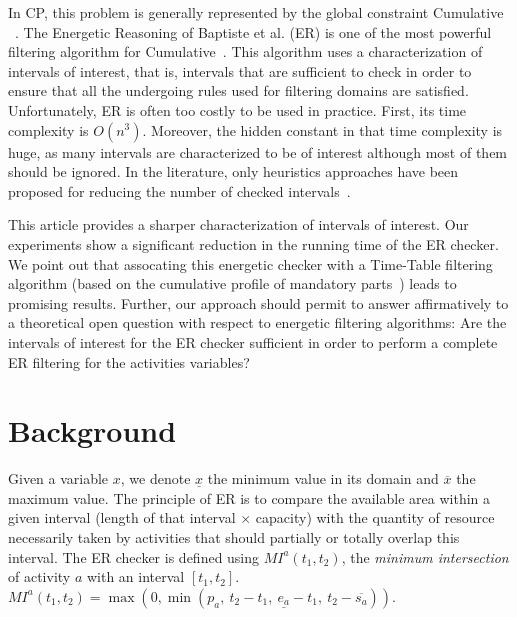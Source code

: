 \documentclass{llncs}
\newcommand \MI[3]{MI^{#3}(#1,#2) }
\begin{document}
In CP, this problem is generally represented by the global constraint \textsf{Cumulative} ~\cite{aggbel93}.
The Energetic Reasoning of Baptiste et al. (ER) is one of the most powerful filtering algorithm for Cumulative~\cite{baptiste:inria-00123562}. 
This algorithm uses a characterization of intervals of interest, that is, intervals that are sufficient to check in order to ensure that all the undergoing rules used 
for filtering domains are satisfied. Unfortunately, ER is often too costly to be used in practice. First, its time complexity is $O(n^3)$. Moreover, 
the hidden constant in that time complexity is huge, as many intervals are characterized to be of interest although most of them should be ignored. 
In the literature, only heuristics approaches have been proposed for reducing the number of checked intervals~\cite{Berthold:2011:ApproxCrit}. 

This article provides a sharper characterization of intervals of interest. 
Our experiments show a significant reduction in the running time of the ER checker. We point out that assocating this energetic checker with a Time-Table filtering algorithm (based on the cumulative profile of mandatory parts~\cite{Letort:ScalableSweep})
leads to promising results. Further, our approach should permit to answer affirmatively to a theoretical open question with respect to energetic filtering algorithms: 
Are the intervals of interest for the ER checker sufficient in order to perform a complete ER filtering for the activities variables?
\section{Background}\label{sec:background}
Given a variable $x$,
we denote $\underline{x}$ the minimum value in its domain and $\overline{x}$ the maximum value. The principle of ER
is to compare the available area within a given interval (length of that interval $\times$ capacity) with the quantity of resource necessarily taken by 
activities that should partially or totally overlap this interval. The ER checker is defined using $\MI{t_1}{t_2}{a}$, the \emph{minimum intersection} of activity $a$ with an interval $[t_1,t_2]$. 
$\MI{t_1}{t_2}{a} = \max\left(0,\min\left(p_a,~t_2\!-\!t_1,~\underline{e_a} \!-\! t_1,~t_2\!-\!\overline{s_a}\right)\right)$. 
\end{document}
